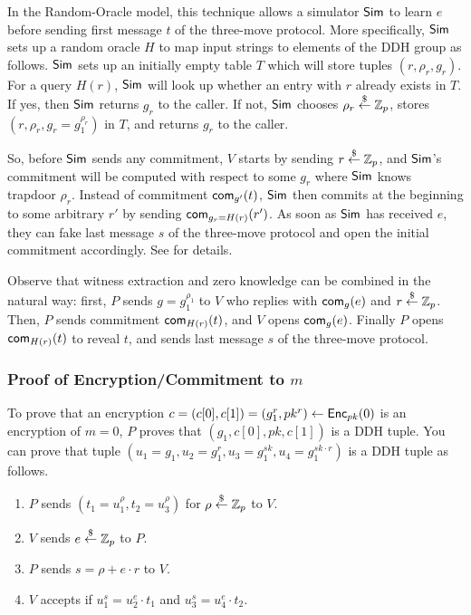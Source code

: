 In the Random-Oracle model, this technique allows a simulator ${\mathsf{Sim}}$
to learn $e$ before sending first message $t$ of the three-move
protocol.  More specifically, ${\mathsf{Sim}}$ sets up a random oracle $H$ to
map input strings to elements of the DDH group as follows. ${\mathsf{Sim}}$ sets
up an initially empty table $T$ which will store tuples
$(r,\rho_r,g_r)$. For a query $H(r)$, ${\mathsf{Sim}}$ will look up whether an
entry with $r$ already exists in $T$. If yes, then ${\mathsf{Sim}}$ returns
$g_r$ to the caller. If not, ${\mathsf{Sim}}$ chooses $\rho_r\stackrel{\$}{\leftarrow}\mathbb{Z}_p$, stores
$(r,\rho_r,g_r=g_1^{\rho_r})$ in $T$, and returns $g_r$ to the caller.

So, before ${\mathsf{Sim}}$ sends any commitment, $V$ starts by sending
$r\stackrel{\$}{\leftarrow}\mathbb{Z}_p$, and ${\mathsf{Sim}}$'s commitment will be computed with respect to
some $g_r$ where ${\mathsf{Sim}}$ knows trapdoor $\rho_r$.  Instead of
commitment $\mathsf{com}_{g'}(t)$, ${\mathsf{Sim}}$ then commits at the beginning to
some arbitrary $r'$ by sending $\mathsf{com}_{g_r=H(r)}(r')$. As soon as
${\mathsf{Sim}}$ has received $e$, they can fake last message $s$ of the
three-move protocol and open the initial commitment accordingly.  See
\citet{crs} for details.

Observe that witness extraction and zero knowledge can be combined in
the natural way: first, $P$ sends $g=g_1^{\rho_1}$ to $V$ who replies
with $\mathsf{com}_g(e)$ and $r\stackrel{\$}{\leftarrow}\mathbb{Z}_p$. Then, $P$ sends commitment
$\mathsf{com}_{H(r)}(t)$, and $V$ opens $\mathsf{com}_g(e)$.  Finally $P$ opens
$\mathsf{com}_{H(r)}(t)$ to reveal $t$, and sends last message $s$ of the
three-move protocol.


\subsubsection{Proof of Encryption/Commitment to $m$}
\label{poe}

To prove that an encryption
$c=(c[0],c[1])=(g_1^r,pk^r)\leftarrow{\mathsf{Enc}}_{pk}(0)$ is an encryption of
$m=0$, $P$ proves that $(g_1,c[0],pk,c[1])$ is a DDH tuple.  You can
prove that tuple
$(u_1=g_1,u_2=g_1^r,u_3=g_1^{sk},u_4=g_1^{sk\cdot{}r})$ is a DDH tuple
as follows.

\begin{enumerate}
\item $P$ sends $(t_1=u_1^{\rho},t_2=u_3^{\rho})$ for $\rho\stackrel{\$}{\leftarrow}\mathbb{Z}_p$ to $V$.
  \item $V$ sends $e\stackrel{\$}{\leftarrow}\mathbb{Z}_p$ to $P$.
  \item $P$ sends $s=\rho+e\cdot{}r$ to $V$.
    \item $V$ accepts if $u_1^s=u_2^e\cdot{}t_1$ and $u_3^s=u_4^e\cdot{}t_2$.
\end{enumerate}

